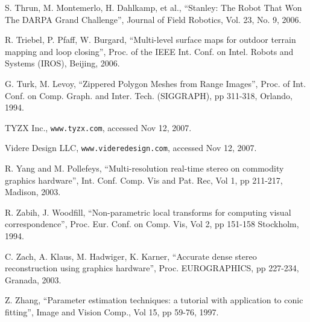 \documentclass[twocolumn,oneside]{book}
\begin{document}
\begin{thebibliography}{99}
S. Thrun, M. Montemerlo, H. Dahlkamp, et al.,
``Stanley: The Robot That Won The DARPA Grand Challenge'',
Journal of Field Robotics, Vol. 23, No. 9, 2006.

R. Triebel, P. Pfaff, W. Burgard,
``Multi-level surface maps for outdoor terrain mapping and loop closing'',
Proc. of the IEEE Int. Conf. on Intel. Robots and Systems (IROS), Beijing, 2006.

G. Turk, M. Levoy,
``Zippered Polygon Meshes from Range Images'',
Proc.  of Int. Conf. on Comp. Graph. and Inter. Tech. (SIGGRAPH), pp 311-318, Orlando, 1994.

TYZX Inc.,
\verb+www.tyzx.com+, accessed Nov 12, 2007.

Videre Design LLC,
\verb+www.videredesign.com+, accessed Nov 12, 2007.

R. Yang and M. Pollefeys,
``Multi-resolution real-time stereo on commodity graphics hardware'',
Int. Conf. Comp. Vis and Pat. Rec, Vol 1, pp 211-217, Madison, 2003.

R. Zabih,  J. Woodfill,
``Non-parametric local transforms for computing visual correspondence'',
Proc. Eur. Conf. on Comp. Vis, Vol 2, pp 151-158 Stockholm, 1994.

C. Zach, A. Klaus, M. Hadwiger, K. Karner,
``Accurate dense stereo reconstruction using graphics hardware'',
Proc. EUROGRAPHICS, pp 227-234, Granada, 2003.

Z. Zhang,
``Parameter estimation techniques: a tutorial with application to conic fitting'',
Image and Vision Comp., Vol 15, pp 59-76, 1997.

\end{thebibliography}
\end{document}
